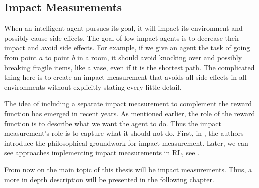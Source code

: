 \documentclass[12pt,A4]{report}
\theoremstyle{definition}
\begin{document}

\subsection{Impact Measurements}

When an intelligent agent pursues its goal, it will impact its environment and possibly cause side effects. The goal of low-impact agents is to decrease their impact and avoid side effects. For example, if we give an agent the task of going from point $a$ to point $b$ in a room, it should avoid knocking over and possibly breaking fragile items, like a vase, even if it is the shortest path. The complicated thing here is to create an impact measurement that avoids all side effects in all environments without explicitly stating every little detail.

The idea of including a separate impact measurement to complement the reward function has emerged in recent years. As mentioned earlier, the role of the reward function is to describe what we want the agent to do. Thus the impact measurement's role is to capture what it should not do. First, in \citet{ArmstrongLevinstein}, the authors introduce the philosophical groundwork for impact measurement. Later, we can see approaches implementing impact measurements in RL, see \citet{Eysenbach, Krakovna19, Turner19, Krakovna20}.

From now on the main topic of this thesis will be impact measurements. Thus, a more in depth description will be presented in the following chapter.


 

\end{document}
